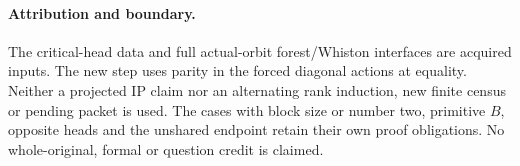 \documentclass[11pt,a4paper]{article}
\begin{document}
\paragraph{Attribution and boundary.}
The critical-head data and full actual-orbit forest/Whiston
interfaces are acquired inputs. The new step uses parity in the
forced diagonal actions at equality. Neither a projected IP claim
nor an alternating rank induction, new finite census or pending
packet is used. The cases with block size or number two, primitive
$B$, opposite heads and the unshared endpoint retain their own
proof obligations. No whole-original, formal or question credit
is claimed.
\end{document}
